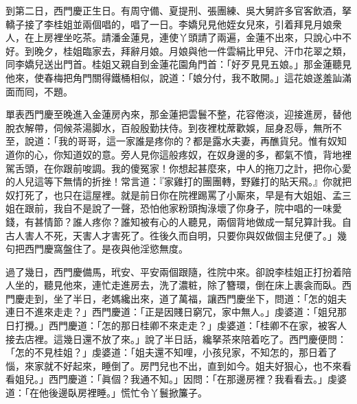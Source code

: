 到第二日，西門慶正生日。有周守備、夏提刑、張團練、吳大舅許多官客飲酒，拏轎子接了李桂姐並兩個唱的，唱了一日。李嬌兒見他姪女兒來，引着拜見月娘衆人，{}在上房裡坐吃茶。請潘金蓮見，連使丫頭請了兩遍，金蓮不出來，只說心中不好。到晚夕，桂姐臨家去，拜辭月娘。月娘與他一件雲絹比甲兒、汗巾花翠之類，同李嬌兒送出門首。桂姐又親自到金蓮花園角門首：「好歹見見五娘。」{}那金蓮聽見他來，使春梅把角門關得鐵桶相似，說道：「娘分付，我不敢開。」這花娘遂羞訕滿面而囘，{}不題。

單表西門慶至晚進入金蓮房內來，那金蓮把雲鬟不整，花容倦淡，{}迎接進房，替他脫衣解帶，伺候茶湯脚水，百般殷勤扶侍。到夜裡枕蓆歡娛，屈身忍辱，無所不至，說道：「我的哥哥，這一家誰是疼你的？都是露水夫妻，再醮貨兒。惟有奴知道你的心，你知道奴的意。旁人見你這般疼奴，在奴身邊的多，都氣不憤，背地裡駕舌頭，在你跟前唆調。我的傻冤家！你想起甚麼來，中人的拖刀之計，把你心愛的人兒這等下無情的折挫！常言道：『家雞打的團團轉，野雞打的貼天飛。』你就把奴打死了，也只在這屋裡。{}就是前日你在院裡踢罵了小厮來，早是有大姐姐、孟三姐在跟前，我自不是說了一聲，恐怕他家粉頭掏淥壞了你身子，院中唱的一味愛錢，有甚情節？誰人疼你？誰知被有心的人聽見，兩個背地做成一幫兒算計我。自古人害人不死，天害人才害死了。徃後久而自明，只要你與奴做個主兒便了。」幾句把西門慶窩盤住了。是夜與他淫慾無度。

過了幾日，西門慶備馬，玳安、平安兩個跟隨，徃院中來。卻說李桂姐正打扮着陪人坐的，聽見他來，連忙走進房去，洗了濃粧，除了簪環，倒在床上裹衾而臥。{}西門慶走到，坐了半日，老媽纔出來，道了萬福，讓西門慶坐下，問道：「怎的姐夫連日不進來走走？」西門慶道：「正是因賤日窮冗，家中無人。」虔婆道：「姐兒那日打攪。」西門慶道：「怎的那日桂卿不來走走？」虔婆道：「桂卿不在家，被客人接去店裡。這幾日還不放了來。」說了半日話，纔拏茶來陪着吃了。西門慶便問：「怎的不見桂姐？」虔婆道：「姐夫還不知哩，小孩兒家，不知怎的，那日着了惱，來家就不好起來，睡倒了。房門兒也不出，直到如今。姐夫好狠心，也不來看看姐兒。」{}西門慶道：「眞個？我通不知。」{}因問：「在那邊房裡？我看看去。」虔婆道：「在他後邊臥房裡睡。」慌忙令丫鬟掀簾子。


